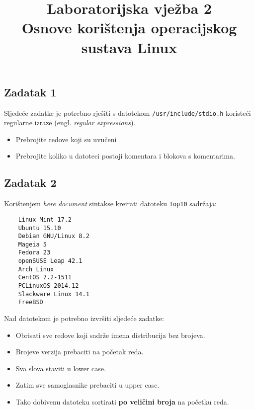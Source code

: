 \documentclass[12pt,a4paper]{article}
\newcommand{\shell}[1]{\texttt{#1}}
\begin{document}
	\title{Laboratorijska vježba 2\\{\small Osnove korištenja operacijskog sustava Linux}\vspace{-2em}}
	\maketitle
	\subsection*{Zadatak 1}
	Sljedeće zadatke je potrebno rješiti s datotekom \shell{/usr/include/stdio.h} koristeći regularne izraze (engl. \emph{regular expressions}).
	\begin{itemize}
		\item Prebrojite redove koji su uvučeni
		\item Prebrojite koliko u datoteci postoji komentara i blokova s komentarima.
	\end{itemize}
	\subsection*{Zadatak 2}
	Korištenjem \emph{here document} sintakse kreirati datoteku \shell{Top10} sadržaja:
	\begin{verbatim}
	Linux Mint 17.2
	Ubuntu 15.10
	Debian GNU/Linux 8.2
	Mageia 5
	Fedora 23
	openSUSE Leap 42.1
	Arch Linux
	CentOS 7.2-1511
	PCLinuxOS 2014.12
	Slackware Linux 14.1
	FreeBSD
	\end{verbatim}
	Nad datotekom je potrebno izvršiti sljedeće zadatke:
	\begin{itemize}
		\item Obrisati sve redove koji sadrže imena distribucija bez brojeva.
		\item Brojeve verzija prebaciti na početak reda.
		\item Sva slova staviti u lower case.
		\item Zatim sve samoglasnike prebaciti u upper case.
		\item Tako dobivenu datoteku sortirati \textbf{po veličini broja} na početku reda.
	\end{itemize}
\end{document}
